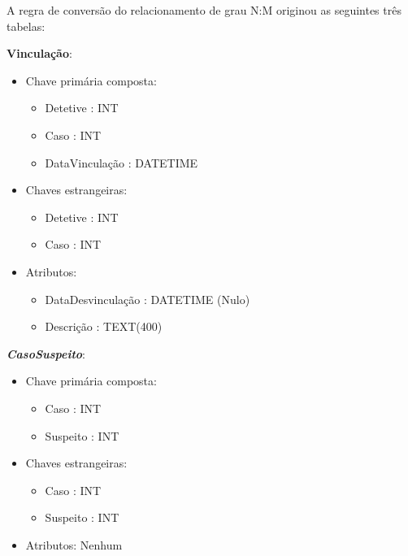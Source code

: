 \documentclass[a4paper,12pt]{scrreprt}
\begin{document}
        A regra de conversão do relacionamento de grau N:M originou as seguintes três tabelas:
        
        \textbf{Vinculação}:
        \begin{itemize}
            \item Chave primária composta:
                \begin{itemize}
                    \item Detetive : INT
                    \item Caso : INT
                    \item DataVinculação : DATETIME
                \end{itemize}
            \item Chaves estrangeiras:
                \begin{itemize}
                    \item Detetive : INT
                    \item Caso : INT
                \end{itemize}
            \item Atributos:
                \begin{itemize} 
                    \item DataDesvinculação : DATETIME (Nulo)
                    \item Descrição : TEXT(400)
                \end{itemize}
        \end{itemize}

        \vspace{0.5cm}

        \textbf{\textit{CasoSuspeito}}:
        \begin{itemize}
            \item Chave primária composta:
                \begin{itemize}
                    \item Caso : INT
                    \item Suspeito : INT
                \end{itemize}
            \item Chaves estrangeiras:
                \begin{itemize}
                    \item Caso : INT
                    \item Suspeito : INT
                \end{itemize}
            \item Atributos: Nenhum
        \end{itemize}
\end{document}
